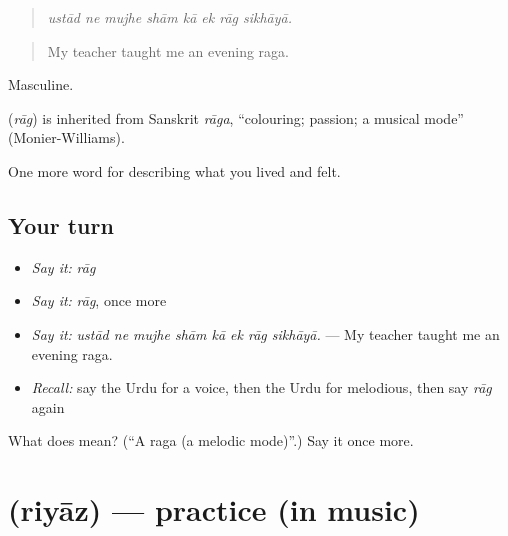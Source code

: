 \begin{quote}
       
\end{quote}

\begin{quote}
\emph{ustād ne mujhe shām kā ek rāg sikhāyā.}
\end{quote}

\begin{quote}
My teacher taught me an evening raga.
\end{quote}

Masculine.

\begin{cousinweb}
\textbf{} (\emph{rāg}) is inherited from Sanskrit \emph{rāga}, \textquotedblleft{}colouring; passion; a musical mode\textquotedblright{} (Monier-Williams).
\end{cousinweb}

\begin{grammarlens}[title={What you've built}]
One more word for describing what you lived and felt.
\end{grammarlens}

\subsection*{Your turn}
\begin{itemize}
\raggedright
  \item \emph{Say it:} \emph{rāg}
  \item \emph{Say it:} \emph{rāg}, once more
  \item \emph{Say it:} \emph{ustād ne mujhe shām kā ek rāg sikhāyā.} — My teacher taught me an evening raga.
  \item \emph{Recall:} say the Urdu for a voice, then the Urdu for melodious, then say \emph{rāg} again
\end{itemize}

\begin{tcolorbox}[breakable,colback=teal!4,colframe=teal!35!black,title={Before you move on}]
What does  mean? (\textquotedblleft{}A raga (a melodic mode)\textquotedblright{}.) Say it once more.
\end{tcolorbox}
\section[\texorpdfstring{\ur{ریاض} (riyāz)}{ریاض (riyāz)}]{ (riyāz) — practice (in music)}


